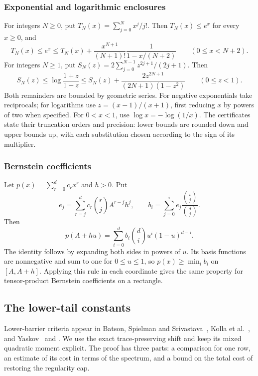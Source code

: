 \documentclass[11pt,a4paper]{article}
\numberwithin{equation}{section}
\begin{document}
\subsubsection{Exponential and logarithmic enclosures}
For integers $N\ge0$, put
$T_N(x)=\sum_{j=0}^{N}x^j/j!$.
Then $T_N(x)\le e^x$ for every $x\ge0$, and
\begin{equation}\label{eq:app-arithmetic-exp}
 T_N(x)\le e^x\le
 T_N(x)+\frac{x^{N+1}}{(N+1)!}\frac1{1-x/(N+2)}
 \qquad(0\le x<N+2).
\end{equation}
For integers $N\ge1$, put
$S_N(z)=2\sum_{j=0}^{N-1}z^{2j+1}/(2j+1)$.
Then
\begin{equation}\label{eq:app-arithmetic-log}
 S_N(z)\le\log\frac{1+z}{1-z}
 \le S_N(z)+\frac{2z^{2N+1}}{(2N+1)(1-z^2)}
 \qquad(0\le z<1).
\end{equation}
Both remainders are bounded by geometric series.
For negative exponentials take reciprocals; for logarithms use
$z=(x-1)/(x+1)$, first reducing $x$ by powers of two when specified.
For $0<x<1$, use $\log x=-\log(1/x)$.
The certificates state their truncation orders and precision:
lower bounds are rounded down and upper bounds up, with each substitution
chosen according to the sign of its multiplier.

\subsubsection{Bernstein coefficients}
Let $p(x)=\sum_{r=0}^d c_rx^r$ and $h>0$. Put
\[
 e_j=\sum_{r=j}^d c_r\binom rj A^{r-j}h^j,\qquad
 b_i=\sum_{j=0}^i e_j\frac{\binom ij}{\binom dj}.
\]
Then
\[
 p(A+hu)=\sum_{i=0}^d b_i\binom di u^i(1-u)^{d-i}.
\]
The identity follows by expanding both sides in powers of $u$.
Its basis functions are nonnegative and sum to one for $0\le u\le1$,
so $p(x)\ge\min_i b_i$ on $[A,A+h]$.
Applying this rule in each coordinate gives the same property for
tensor-product Bernstein coefficients on a rectangle.



\subsection{The lower-tail constants}\label{app:low}

Lower-barrier criteria appear in Batson, Spielman and
Srivastava~\cite[Lemma~3.4]{batson2012twice}, Kolla et
al.~\cite[Lemma~3.11]{kolla2010subgraph}, and
Yaskov~\cite[Lemmas~4.1--4.2]{yaskov2014lower} and
\cite[Lemma~4.1]{yaskov2016controlling}. We use the exact trace-preserving
shift and keep its mixed quadratic moment explicit. The proof has three
parts: a comparison for one row, an estimate of its cost in terms of the
spectrum, and a bound on the total cost of restoring the regularity cap.
\end{document}
